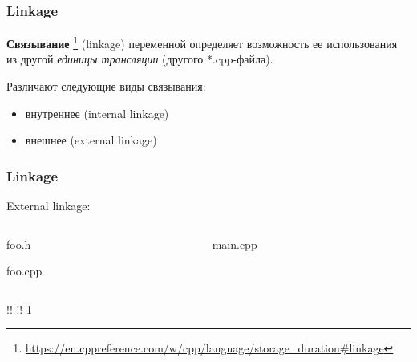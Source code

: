 \documentclass[compress, 8pt]{beamer}
\begin{document}
\begin{frame}[fragile]

    \frametitle{Linkage}

    \textbf{Связывание}
    \footnote{\url{https://en.cppreference.com/w/cpp/language/storage\_duration\#linkage}}
    (linkage) переменной определяет возможность ее использования из другой
    \textit{единицы трансляции} (другого *.cpp-файла).

    \hfill \break
    Различают следующие виды связывания:

    \begin{itemize}
        \item внутреннее (internal linkage)
        \item внешнее (external linkage)
    \end{itemize}

\end{frame}

\begin{frame}[fragile]

    \frametitle{Linkage}

    External linkage:

    \begin{columns}[T]
        \begin{column}{0.5\textwidth}

                {foo.h}

                {foo.cpp}

        \end{column}
        \begin{column}{0.5\textwidth}

                {main.cpp}

        \end{column}
    \end{columns}

    \begin{terminalwindow}
!!
!!
1
    \end{terminalwindow}

\end{frame}
\end{document}
